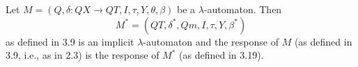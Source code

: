 Let $M = (Q, \delta: QX \to QT, I, \tau, Y, \theta, \beta)$ be a $\lambda$-automaton. Then
$$M^* = (QT, \delta^*, Qm, I, \tau, Y, \beta^*)$$
as defined in 3.9 is an implicit $\lambda$-automaton and the response of $M$ (as defined in 3.9, i.e., as in 2.3) is the response of $M^*$ (as defined in 3.19).
